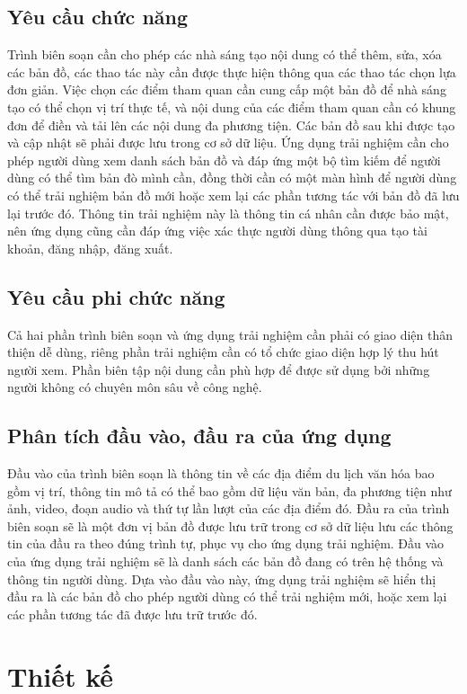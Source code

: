 \subsection*{Yêu cầu chức năng}
Trình biên soạn cần cho phép các nhà sáng tạo nội dung có thể thêm, sửa,
xóa các bản đồ, các thao tác này cần được thực hiện thông qua các thao tác chọn lựa
đơn giản. Việc chọn các điểm tham quan cần cung cấp một bản đồ để nhà sáng tạo
có thể chọn vị trí thực tế, và nội dung của các điểm tham quan cần có khung đơn để
điền và tải lên các nội dung đa phương tiện. Các bản đồ sau khi được tạo và cập
nhật sẽ phải được lưu trong cơ sở dữ liệu.
Ứng dụng trải nghiệm cần cho phép người dùng xem danh sách bản đồ và
đáp ứng một bộ tìm kiếm để người dùng có thể tìm bản đò mình cần, đồng thời cần
có một màn hình để người dùng có thể trải nghiệm bản đồ mới hoặc xem lại các
phần tương tác với bản đồ đã lưu lại trước đó. Thông tin trải nghiệm này là thông
tin cá nhân cần được bảo mật, nên ứng dụng cũng cần đáp ứng việc xác thực người
dùng thông qua tạo tài khoản, đăng nhập, đăng xuất.
\subsection*{Yêu cầu phi chức năng}
Cả hai phần trình biên soạn và ứng dụng trải nghiệm cần phải có giao diện
thân thiện dễ dùng, riêng phần trải nghiệm cần có tổ chức giao diện hợp lý thu hút
người xem.
Phần biên tập nội dung cần phù hợp để được sử dụng bởi những người không
có chuyên môn sâu về công nghệ.

\subsection{Phân tích đầu vào, đầu ra của ứng dụng}
Đầu vào của trình biên soạn là thông tin về các địa điểm du lịch văn hóa bao
gồm vị trí, thông tin mô tả có thể bao gồm dữ liệu văn bản, đa phương tiện như ảnh,
video, đoạn audio và thứ tự lần lượt của các địa điểm đó. Đầu ra của trình biên soạn
sẽ là một đơn vị bản đồ được lưu trữ trong cơ sở dữ liệu lưu các thông tin của đầu ra
theo đúng trình tự, phục vụ cho ứng dụng trải nghiệm.
Đầu vào của ứng dụng trải nghiệm sẽ là danh sách các bản đồ đang có trên hệ
thống và thông tin người dùng. Dựa vào đầu vào này, ứng dụng trải nghiệm sẽ hiển
thị đầu ra là các bản đồ cho phép người dùng có thể trải nghiệm mới, hoặc xem lại
các phần tương tác đã được lưu trữ trước đó.

\section{Thiết kế}

